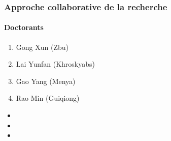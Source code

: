 \documentclass[xcolor=table]{beamer}
\begin{document}
  \begin{frame} 
 \frametitle{Approche collaborative de la recherche} 
 \framesubtitle{Doctorants} 

\begin{enumerate}
\item Gong Xun (Zbu)
\item Lai Yunfan (Khroskyabs)
\item Gao Yang (Menya)
\item Rao Min (Guiqiong)
\end{enumerate}

\begin{itemize}
\item  {}
\item  {}  
\item  {}
\end{itemize}   
  \end{frame}   
\end{document}
